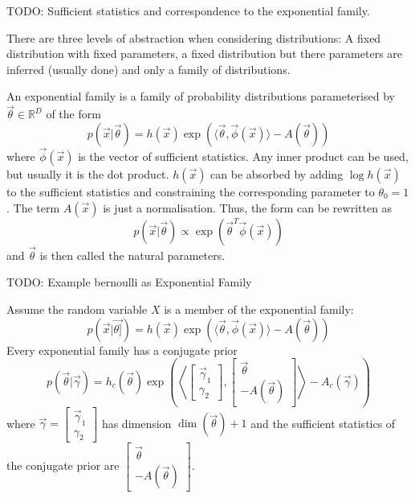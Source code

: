 TODO: Sufficient statistics and correspondence to the exponential family.

There are three levels of abstraction when considering distributions:
A fixed distribution with fixed parameters,
a fixed distribution but there parameters are inferred (usually done)
and only a family of distributions.

An exponential family is a family of probability distributions
parameterised by $\vec{\theta} \in \mathbb{R}^D$ of the form
\begin{equation*}
    p(\vec{x} | \vec{\theta}) = h(\vec{x})
        \exp(\langle \vec{\theta}, \vec{\phi}(\vec{x}) \rangle - A(\vec{\theta}))
\end{equation*}
where $\vec{\phi}(\vec{x})$ is the vector of sufficient statistics.
Any inner product can be used, but usually it is the dot product.
$h(\vec{x})$ can be absorbed by adding $\log h(\vec{x})$ to the
sufficient statistics and constraining the corresponding parameter
to $\theta_0 = 1$.
The term $A(\vec{x})$ is just a normalisation.
Thus, the form can be rewritten as
\begin{equation*}
    p(\vec{x} | \vec{\theta}) \propto \exp(\vec{\theta}^T \vec{\phi}(\vec{x}))
\end{equation*}
and $\vec{\theta}$ is then called the natural parameters.

TODO: Example bernoulli as Exponential Family

Assume the random variable $X$ is a member of the exponential family:
\begin{equation*}
    p(\vec{x} | \vec{\theta]}) =
    h(\vec{x})
        \exp(\langle \vec{\theta}, \vec{\phi}(\vec{x}) \rangle - A(\vec{\theta}))
\end{equation*}
Every exponential family has a conjugate prior
\begin{equation*}
    p(\vec{\theta} | \vec{\gamma}) =
    h_c(\vec{\theta}) \exp\left(
        \left\langle 
            \begin{bmatrix}
                \vec{\gamma}_1 \\
                \gamma_2
            \end{bmatrix},
            \begin{bmatrix}
                \vec{\theta} \\
                -A(\vec{\theta})
            \end{bmatrix}
        \right\rangle
        - A_c(\vec{\gamma})
    \right)
\end{equation*}
where $\vec{\gamma} = 
\begin{bmatrix}
    \vec{\gamma}_1 \\
    \gamma_2
\end{bmatrix}$ has dimension $\dim(\vec{\theta}) + 1$
and the sufficient statistics of the conjugate prior are
$\begin{bmatrix}
    \vec{\theta} \\
    -A(\vec{\theta})
\end{bmatrix}$.

